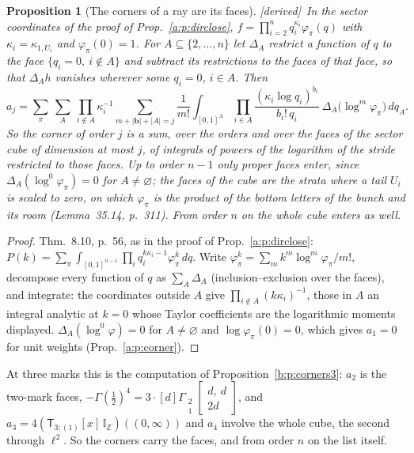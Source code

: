 \documentclass[11pt]{article}
\newcommand{\sT}{\mathsf T}
\newcommand{\Gst}[4]{\Gamma_{\substack{#1\\#2}}\!\begin{bmatrix}#3\\#4\end{bmatrix}}
\newcommand{\IZ}{\mathbb I_{\mathbb Z}}
\newcommand{\Tx}[3]{(\sT_{#1;(1)}[x]\,#2)((#3,\infty))}
\theoremstyle{plain}
\newtheorem{proposition}{Proposition}[section]
\theoremstyle{definition}
\theoremstyle{remark}
\newcommand{\derived}{\textup{[derived]}}
\begin{document}
\begin{proposition}[The corners of a ray are its faces]\label{b:p:facecorners}\derived\
In the sector coordinates of the proof of Prop.~\ref{a:p:dirclose}, $f=\prod_{i=2}^nq_i^{\kappa_i}\varphi_\pi(q)$ with $\kappa_i=\kappa_{1,U_i}$ and $\varphi_\pi(0)=1$. For $A\subseteq\{2,\dots,n\}$ let $\Delta_A$ restrict a function of $q$ to the face $\{q_i=0,\ i\notin A\}$ and subtract its restrictions to the faces of that face, so that $\Delta_Ah$ vanishes wherever some $q_i=0$, $i\in A$. Then
\[
a_j=\sum_\pi\ \sum_{A}\ \prod_{i\notin A}\kappa_i^{-1}\sum_{m+|\mathbf b|+|A|=j}\frac1{m!}\int_{[0,1]^A}\prod_{i\in A}\frac{(\kappa_i\log q_i)^{b_i}}{b_i!\,q_i}\ \Delta_A\big(\log^m\varphi_\pi\big)\,dq_A .
\]
So the corner of order $j$ is a sum, over the orders and over the faces of the sector cube of dimension at most $j$, of integrals of powers of the logarithm of the stride restricted to those faces. Up to order $n-1$ only proper faces enter, since $\Delta_A(\log^0\varphi_\pi)=0$ for $A\neq\varnothing$; the faces of the cube are the strata where a tail $U_i$ is scaled to zero, on which $\varphi_\pi$ is the product of the bottom letters of the bunch and its room (Lemma~35.14, p.~311). From order $n$ on the whole cube enters as well.
\end{proposition}

\begin{proof}
Thm.~8.10, p.~56, as in the proof of Prop.~\ref{a:p:dirclose}: $P(k)=\sum_\pi\int_{[0,1]^{n-1}}\prod_iq_i^{k\kappa_i-1}\varphi_\pi^k\,dq$. Write $\varphi_\pi^k=\sum_mk^m\log^m\varphi_\pi/m!$, decompose every function of $q$ as $\sum_A\Delta_A$ (inclusion--exclusion over the faces), and integrate: the coordinates outside $A$ give $\prod_{i\notin A}(k\kappa_i)^{-1}$, those in $A$ an integral analytic at $k=0$ whose Taylor coefficients are the logarithmic moments displayed. $\Delta_A(\log^0\varphi)=0$ for $A\neq\varnothing$ and $\log\varphi_\pi(0)=0$, which gives $a_1=0$ for unit weights (Prop.~\ref{a:p:corner}).
\end{proof}

At three marks this is the computation of Proposition~\ref{b:p:corners3}: $a_2$ is the two-mark faces, $-\Gamma(\frac12)^4=3\cdot[d]\Gst21{d,\ d}{2d}$, and $a_3=4\Tx3{\IZ}0$ and $a_4$ involve the whole cube, the second through $\ell^2$. So the corners carry the faces, and from order $n$ on the list itself.
\end{document}
